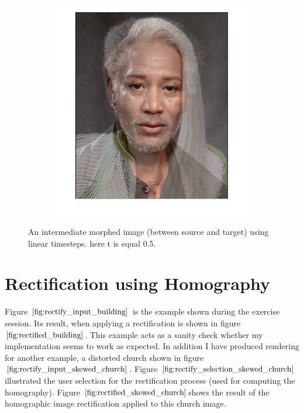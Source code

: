 \documentclass{paper}
\begin{document}
\begin{figure}[H]
    \centering
    \begin{subfigure}{1.0\textwidth}
        \includegraphics[width=\textwidth]{morph/intermediate_morph}
    \end{subfigure}
    
    \caption{An intermediate morphed image (between source and target) using linear timesteps. here t is equal 0.5.}
    \label{fig:morphing_intermediate}       
\end{figure}

\section{Rectification using Homography}
Figure $\ref{fig:rectify_input_building}$ is the example shown during the exercise session. Its result, when applying a rectification is shown in figure $\ref{fig:rectified_building}$. This example acts as a sanity check whether my implementation seems to work as expected. In addition I have produced rendering for another example, a distorted church shown in figure $    \ref{fig:rectify_input_skewed_church}$. Figure $\ref{fig:rectify_selection_skewed_church}$illustrated the user selection for the rectification process (used for computing the homography). Figure $ \ref{fig:rectified_skewed_church}$shows the result of the homographic image rectification applied to this church image. \\
\end{document}

